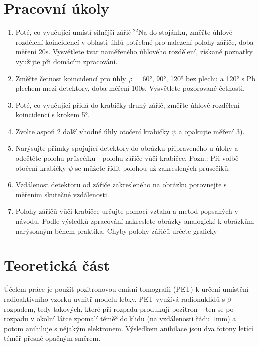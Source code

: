 \documentclass[10pt,a4paper]{article}
\renewcommand{\U}[1]{\ensuremath{\mathrm{#1}}}
\begin{document}


\section{Pracovní úkoly}
\begin{enumerate}
    \item Poté, co vyučující umístí silnější zářič ${}^{22}$Na do stojánku, změřte úhlové rozdělení koincidencí v oblasti úhlů potřebné pro nalezení polohy zářiče, doba měření 20s. Vysvětlete tvar naměřeného úhlového rozdělení, získané poznatky využijte při domácím zpracování.

    \item Změřte četnost koincidencí pro úhly $\varphi$ = 60°, 90°, 120° bez plechu a 120° s Pb plechem mezi detektory, doba měření 100s. Vysvětlete pozorované četnosti.
    
    \item Poté, co vyučující přidá do krabičky druhý zářič, změřte úhlové rozdělení koincidencí s krokem 5°.
    
    \item Zvolte aspoň 2 další vhodné úhly otočení krabičky $\psi$ a opakujte měření 3).
    
    \item Narýsujte přímky spojující detektory do obrázku připraveného u úlohy a odečtěte polohu průsečíku - polohu zářiče vůči krabičce. Pozn.: Při volbě otočení krabičky $\psi$ se můžete řídit polohou už zakreslených průsečíků.
    
    \item Vzdálenost detektoru od zářiče zakresleného na obrázku porovnejte s měřením skutečné vzdálenosti.
    
    \item Polohy zářičů vůči krabičce určujte pomocí vztahů a metod popsaných v návodu. Podle výsledků zpracování nakreslete obrázky analogické k obrázkům narýsoaným během praktika. Chyby polohy zářičů určete graficky
\end{enumerate}


\section{Teoretická část}
Účelem práce je použít pozitronovou emisní tomografii (PET) k určení umístění radioaktivního vzorku uvnitř modelu lebky.
PET využívá radionuklidů s $\beta^+$ rozpadem, tedy takových, které při rozpadu produkují pozitron – ten se po rozpadu v okolní látce zpomalí téměř do klidu (na vzdálenosti řádu $1 \U{mm}$) a potom anihiluje s nějakým elektronem. Výsledkem anihilace jsou dva fotony letící téměř přesně opačným směrem. \cite{studijni-text}
\end{document}
